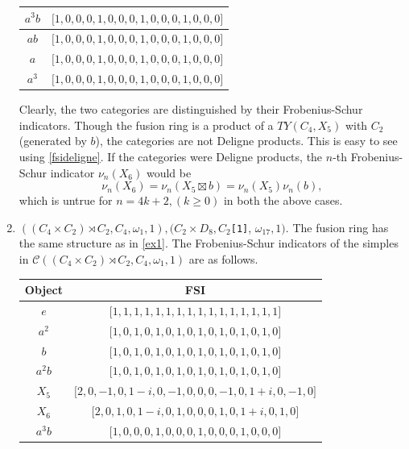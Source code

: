 \documentclass[a4paper, 10pt]{book}
\theoremstyle{definition}
\numberwithin{equation}{chapter}
\newcommand\lstl{\lstinline}
\newcommand\C{\mathcal C}
\newcommand\semidir\rtimes
\begin{document}
\begin{enumerate}
\begin{center}
\begin{tabular}{|c|c|}
$a^3b$ & ${[}1, 0, 0, 0, 1, 0, 0, 0, 1, 0, 0, 0, 1, 0, 0, 0{]}$         \\ \hline
$ab$   & ${[}1, 0, 0, 0, 1, 0, 0, 0, 1, 0, 0, 0, 1, 0, 0, 0{]}$         \\ \hline
$a$    & ${[}1, 0, 0, 0, 1, 0, 0, 0, 1, 0, 0, 0, 1, 0, 0, 0{]}$         \\ \hline
$a^3$  & ${[}1, 0, 0, 0, 1, 0, 0, 0, 1, 0, 0, 0, 1, 0, 0, 0{]}$         \\ \hline
\end{tabular}
\end{center}
Clearly, the two categories are distinguished by their Frobenius-Schur indicators. Though the fusion ring is a product of a $TY(C_4, X_5)$ with $C_2$ (generated by $b$), the categories are not Deligne products. This is easy to see using \eqref{fsideligne}. If the categories were Deligne products, the $n$-th Frobenius-Schur indicator $\nu_n(X_6)$ would be \begin{equation*}
	\nu_n(X_6) = \nu_n(X_5 \boxtimes b) = \nu_n(X_5)\nu_n(b),
\end{equation*} which is untrue for $n=4k+2, (k\geq 0)$ in both the above cases. 
\item $((C_4 \times C_2) \semidir C_2, C_4, \omega_1, 1), (C_2 \times D_8, C_2$\lstl{[1]}, $\omega_{17}, 1).$ The fusion ring has the same structure as in \ref{ex1}. The Frobenius-Schur indicators of the simples in $\C ((C_4 \times C_2) \semidir C_2, C_4 , \omega_1, 1)$ are as follows.
\begin{center}
\begin{tabular}{|c|c|}
\hline
Object & FSI                                                              \\ \hline
$e$    & ${[}1, 1, 1, 1, 1, 1, 1, 1, 1, 1, 1, 1, 1, 1, 1, 1{]}$             \\ \hline
$a^2$  & ${[}1, 0, 1, 0, 1, 0, 1, 0, 1, 0, 1, 0, 1, 0, 1, 0{]}$             \\ \hline
$b$    & ${[}1, 0, 1, 0, 1, 0, 1, 0, 1, 0, 1, 0, 1, 0, 1, 0{]}$             \\ \hline
$a^2b$ & ${[}1, 0, 1, 0, 1, 0, 1, 0, 1, 0, 1, 0, 1, 0, 1, 0{]}$             \\ \hline
$X_5$  & ${[}2, 0, -1, 0, 1 - i, 0, -1, 0, 0, 0, -1, 0, 1 + i, 0, -1, 0{]}$ \\ \hline
$X_6$  & ${[}2, 0, 1, 0, 1 - i, 0, 1, 0, 0, 0, 1, 0, 1 + i, 0, 1, 0{]}$     \\ \hline
$a^3b$ & ${[}1, 0, 0, 0, 1, 0, 0, 0, 1, 0, 0, 0, 1, 0, 0, 0{]}$             \\ \hline

\end{tabular}
\end{center}
\end{enumerate}
\end{document}
